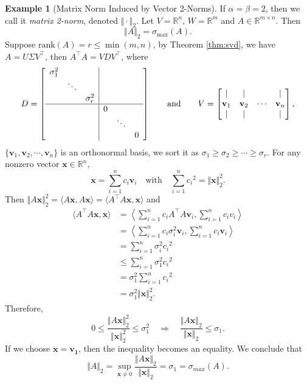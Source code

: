 \documentclass[12pt]{article}
\theoremstyle{definition}
\newtheorem{example}[theorem]{Example}
\begin{document}
\begin{example}[Matrix Norm Induced by Vector 2-Norms] \label{exp:2_norm}
    If $\alpha = \beta = 2$, then we call it \textit{matrix 2-norm}, denoted $\Vert\cdot\Vert_2$. Let $V=\mathbb{R}^n$, $W=\mathbb{R}^m$ and $A\in\mathbb{R}^{m\times n}$. Then
    \[ \Vert A\Vert_2 = \sigma_\text{max} (A). \]
    Suppose $\mathrm{rank}(A)=r \leq \min{(m,n)}$, by Theorem \ref{thm:svd}, we have $A = U\Sigma V^\top$, then $A^\top A = VDV^\top$, where
    \[ D =
    \left[\begin{array}{ccc|ccc}
    \sigma_1^2& & & & & \\
         &\ddots& & & & \\
          & &\sigma_r^2& & & \\ \hline
           & & &0& & \\
            & & & &\ddots& \\
             & & & & &0
    \end{array}
    \right]
    \qquad \text{and} \qquad
    V = 
    \begin{bmatrix}
        | & | &  & | \\
        \mathbf{v}_1 & \mathbf{v}_2 & \cdots & \mathbf{v}_n \\
        | & | &  & |
    \end{bmatrix},
    \]
    $\{\mathbf{v}_1,\mathbf{v}_2,\cdots ,\mathbf{v}_n\}$ is an orthonormal basis, we sort it as $\sigma_1 \geq \sigma_2 \geq \cdots \geq \sigma_r$. For any nonzero vector $\mathbf{x} \in \mathbb{R}^n$, 
    \[ \mathbf{x}=\sum_{i=1}^n{c_i \mathbf{v}_i} 
    \quad \text{with}\quad 
    \sum_{i=1}^n{c_i}^2=\Vert \mathbf{x} \Vert_2^2.
    \]
    Then $\Vert A\mathbf{x} \Vert_2^2=\langle A\mathbf{x},A\mathbf{x}\rangle=\langle A^\top A\mathbf{x},\mathbf{x}\rangle$ and
    \begin{align*}
        \langle A^\top A\mathbf{x},\mathbf{x}\rangle
        &= \left\langle \sum_{i=1}^n {c_iA^\top A \mathbf{v}_i}, \sum_{i=1}^n{c_iv_i} \right\rangle \\
        &= \left\langle \sum_{i=1}^n {c_i\sigma_i^2 \mathbf{v}_i}, \sum_{i=1}^n{c_i \mathbf{v}_i} \right\rangle \\
        &= \sum_{i=1}^n {\sigma_i^2}{c_i}^2 \\
        &\leq \sum_{i=1}^n {\sigma_1^2}{c_i}^2 \\
        &= \sigma_1^2 \sum_{i=1}^n {c_i}^2 \\
        &= \sigma_1^2\Vert \mathbf{x} \Vert_2^2.
    \end{align*}
    Therefore,
    \[ 0 \leq \frac{\Vert A\mathbf{x} \Vert_2^2}{\Vert \mathbf{x} \Vert_2^2} \leq \sigma_1^2 
    \quad\Longrightarrow\quad
    \frac{\Vert A\mathbf{x} \Vert_2}{\Vert \mathbf{x} \Vert_2} \leq \sigma_1.
    \]
    If we choose $\mathbf{x}=\mathbf{v_1}$, then the inequality becomes an equality. We conclude that
    \[ \Vert A \Vert_2
    = \sup_{\mathbf{x} \neq 0} \frac{\Vert A\mathbf{x} \Vert_2}{\Vert \mathbf{x} \Vert_2}
    = \sigma_1
    = \sigma_{max}(A).
    \]  
\end{example}
\end{document}
